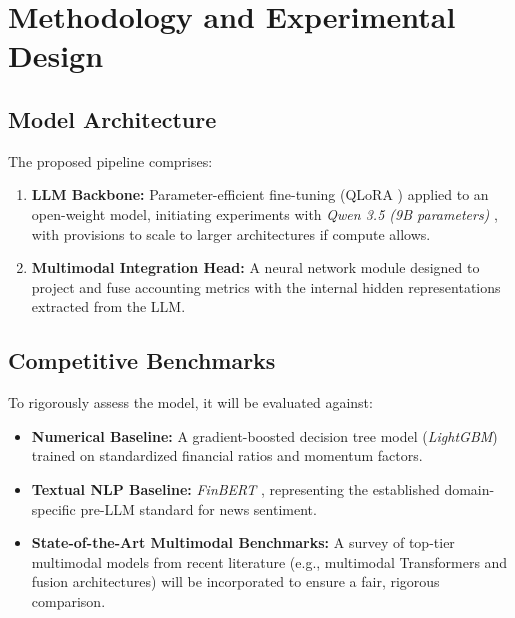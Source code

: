 \documentclass[11pt,a4paper]{article}
\begin{document}
\section{Methodology and Experimental Design}
\label{sec:methodology}

\subsection{Model Architecture}
The proposed pipeline comprises:
\begin{enumerate}[leftmargin=*]
    \item \textbf{LLM Backbone:} Parameter-efficient fine-tuning (QLoRA \citep{dettmers2024qlora}) applied to an open-weight model, initiating experiments with \textit{Qwen 3.5 (9B parameters)} \citep{qwen2024team}, with provisions to scale to larger architectures if compute allows.
    \item \textbf{Multimodal Integration Head:} A neural network module designed to project and fuse accounting metrics with the internal hidden representations extracted from the LLM.
\end{enumerate}

\subsection{Competitive Benchmarks}
To rigorously assess the model, it will be evaluated against:
\begin{itemize}[leftmargin=*]
    \item \textbf{Numerical Baseline:} A gradient-boosted decision tree model (\textit{LightGBM}) trained on standardized financial ratios and momentum factors.
    \item \textbf{Textual NLP Baseline:} \textit{FinBERT} \citep{araci2019finbert}, representing the established domain-specific pre-LLM standard for news sentiment.
    \item \textbf{State-of-the-Art Multimodal Benchmarks:} A survey of top-tier multimodal models from recent literature (e.g., multimodal Transformers and fusion architectures) will be incorporated to ensure a fair, rigorous comparison.
\end{itemize}
\end{document}
